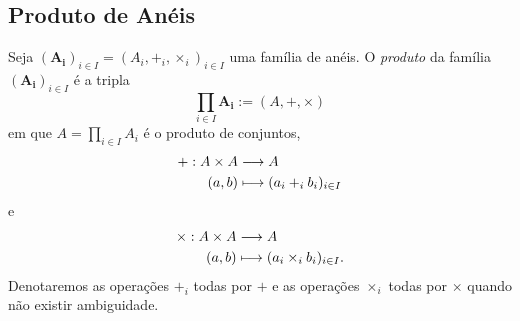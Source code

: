 
\subsection{Produto de Anéis}

\begin{defi}
Seja $(\bm{A_i})_{i \in I}=(A_i,+_i,\times_i)_{i \in I}$ uma família de anéis. O \emph{produto} da família $(\bm{A_i})_{i \in I}$ é a tripla
	\begin{equation*}
	\prod_{i \in I} \bm{A_i} := (A,+,\times)
	\end{equation*}
em que $A = \prod_{i \in I} A_i$ é o produto de conjuntos,
	\begin{align*}
	{+}: {A \times A} &\longrightarrow {A} \\{(a,b)} &\longmapsto {(a_i +_i b_i)_{i \in I}}
	\end{align*}
e
	\begin{align*}
	{\times}: {A \times A} &\longrightarrow {A} \\{(a,b)} &\longmapsto {(a_i \times_i b_i)_{i \in I}}.
	\end{align*}
Denotaremos as operações $+_i$ todas por $+$ e as operações $\times_i$ todas por $\times$ quando não existir ambiguidade.
\end{defi}

